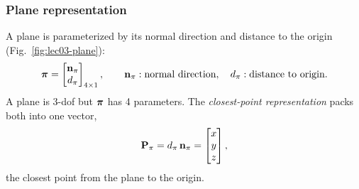 \subsubsection*{Plane representation}
A plane is parameterized by its normal direction and distance to the origin (Fig.~\ref{fig:lec03-plane}):
\begin{align}
\boldsymbol{\mathbf{\pi}} = \begin{bmatrix} \boldsymbol{\mathbf{n}}_\pi \\ d_\pi \end{bmatrix}_{4\times1}, \qquad
\boldsymbol{\mathbf{n}}_\pi : \text{normal direction}, \quad d_\pi : \text{distance to origin}.
\end{align}
A plane is 3-dof but $\boldsymbol{\mathbf{\pi}}$ has 4 parameters. The \emph{closest-point representation} packs both into one vector,
\begin{align}
\boldsymbol{\mathbf{P}}_\pi = d_\pi\,\boldsymbol{\mathbf{n}}_\pi = \begin{bmatrix} x \\ y \\ z \end{bmatrix},
\end{align}
the closest point from the plane to the origin.

